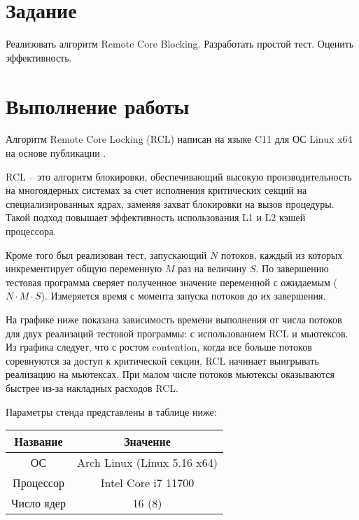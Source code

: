 \documentclass[a4paper,14pt]{extarticle}
\begin{document}


\renewcommand*{\thepage}{}
\tableofcontents
\clearpage
\renewcommand*{\thepage}{\arabic{page}}

\setcounter{page}{3}

\section{Задание}

Реализовать алгоритм Remote Core Blocking. Разработать простой тест. Оценить
эффективность.

\section{Выполнение работы}

Алгоритм Remote Core Locking (RCL) написан на языке C11 для ОС Linux x64 на
основе публикации \cite{lozi12}.

RCL -- это алгоритм блокировки, обеспечивающий высокую производительность на
многоядерных системах за счет исполнения критических секций на
специализированных ядрах, заменяя захват блокировки на вызов процедуры. Такой
подход повышает эффективность использования L1 и L2 кэшей процессора.

Кроме того был реализован тест, запускающий $N$ потоков, каждый из которых
инкрементирует общую переменную $M$ раз на величину $S$. По завершению тестовая
программа сверяет полученное значение переменной с ожидаемым ($N\cdot M\cdot
S$). Измеряется время с момента запуска потоков до их завершения.

На графике ниже показана зависимость времени выполнения от числа потоков для
двух реализаций тестовой программы: с использованием RCL и мьютексов. Из
графика следует, что с ростом contention, когда все больше потоков соревнуются
за доступ к критической секции, RCL начинает выигрывать реализацию на
мьютексах. При малом числе потоков мьютексы оказываются быстрее из-за накладных
расходов RCL.

Параметры стенда представлены в таблице ниже:

\begin{table}[H]
\centering
\begin{tabular}{|c|c|}
    \hline
    Название & Значение \\
    \hline
    ОС & Arch Linux (Linux 5.16 x64) \\
    \hline
    Процессор & Intel Core i7 11700 \\
    \hline
    Число ядер & 16 (8) \\
    \hline
\end{tabular}
\end{table}
\end{document}
